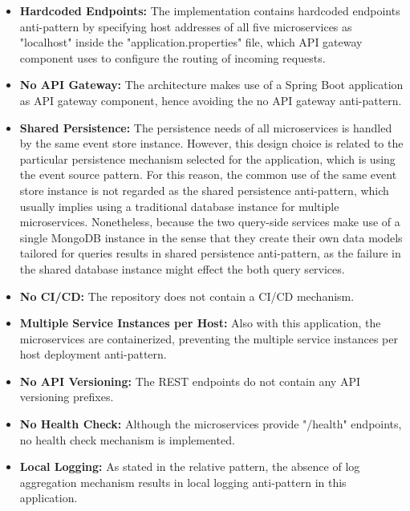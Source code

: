 \documentclass{Configuration_Files/PoliMi3i_thesis}
\begin{document}
\begin{itemize}
    \item \textbf{Hardcoded Endpoints:} The implementation contains hardcoded endpoints anti-pattern by specifying host addresses of all five microservices as "localhost" inside the "application.properties" file, which API gateway component uses to configure the routing of incoming requests.
    
    \item \textbf{No API Gateway:} The architecture makes use of a Spring Boot application as API gateway component, hence avoiding the no API gateway anti-pattern.
    
    \item \textbf{Shared Persistence:} The persistence needs of all microservices is handled by the same event store instance.
    However, this design choice is related to the particular persistence mechanism selected for the application, which is using the event source pattern.
    For this reason, the common use of the same event store instance is not regarded as the shared persistence anti-pattern, which usually implies using a traditional database instance for multiple microservices. 
    Nonetheless, because the two query-side services make use of a single MongoDB instance in the sense that they create their own data models tailored for queries results in shared persistence anti-pattern, as the failure in the shared database instance might effect the both query services.
    
    \item \textbf{No CI/CD:} The repository does not contain a CI/CD mechanism.
    
    \item \textbf{Multiple Service Instances per Host:} Also with this application, the microservices are containerized, preventing the multiple service instances per host deployment anti-pattern.
    
    \item \textbf{No API Versioning:} The REST endpoints do not contain any API versioning prefixes.
    
    \item \textbf{No Health Check:} Although the microservices provide "/health" endpoints, no health check mechanism is implemented.
    
    \item \textbf{Local Logging:} As stated in the relative pattern, the absence of log aggregation mechanism results in local logging anti-pattern in this application.\\\\\\
\end{itemize}
\end{document}
